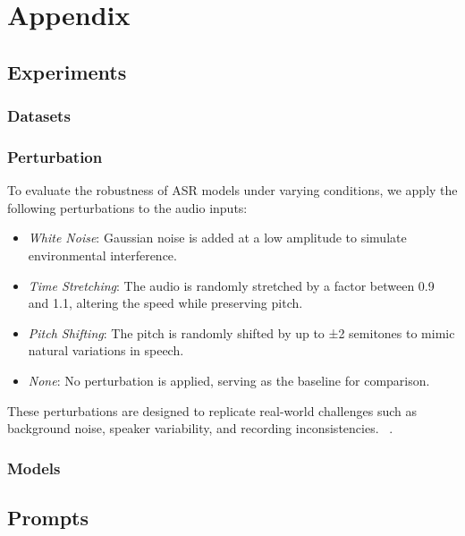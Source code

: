 \section{Appendix}

\subsection{Experiments}\label{appsubsec:experiments}
\subsubsection{Datasets}\label{appsubsubsec:datasets}


\subsubsection{Perturbation}\label{appsubsubsec:perturbation}


To evaluate the robustness of ASR models under varying conditions, we apply the following perturbations to the audio inputs:  
\begin{itemize}  
    \item \emph{White Noise}: Gaussian noise is added at a low amplitude to simulate environmental interference.  
    \item \emph{Time Stretching}: The audio is randomly stretched by a factor between 0.9 and 1.1, altering the speed while preserving pitch.  
    \item \emph{Pitch Shifting}: The pitch is randomly shifted by up to ±2 semitones to mimic natural variations in speech.  
    \item \emph{None}: No perturbation is applied, serving as the baseline for comparison.  
\end{itemize}  

These perturbations are designed to replicate real-world challenges such as background noise, speaker variability, and recording inconsistencies. ~.  

\subsubsection{Models}\label{appsubsubsec:models}


\subsection{Prompts}\label{appsubsec:prompts}
% 
% 



